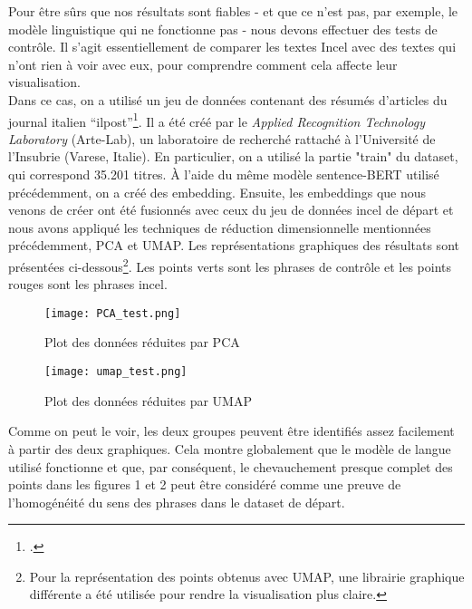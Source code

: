 Pour être sûrs que nos résultats sont fiables - et que ce n'est pas, par exemple, le modèle linguistique qui ne fonctionne pas - nous devons effectuer des tests de contrôle. Il s'agit essentiellement de comparer les textes Incel avec des textes qui n'ont rien à voir avec eux, pour comprendre comment cela affecte leur visualisation.\\

Dans ce cas, on a utilisé un jeu de données contenant des résumés d'articles du journal italien “ilpost”\footcite{ilpost2022}. Il a été créé par le \emph{Applied Recognition Technology Laboratory} (Arte-Lab), un laboratoire de recherché rattaché à l'Université de l'Insubrie (Varese, Italie). En particulier, on a utilisé la partie "train" du dataset, qui correspond 35.201 titres. À l'aide du même modèle sentence-BERT utilisé précédemment, on a créé des embedding. Ensuite, les embeddings que nous venons de créer ont été fusionnés avec ceux du jeu de données incel de départ et nous avons appliqué les techniques de réduction dimensionnelle mentionnées précédemment, PCA et UMAP. Les représentations graphiques des résultats sont présentées ci-dessous\footnote{Pour la représentation des points obtenus avec UMAP, une librairie graphique différente a été utilisée pour rendre la visualisation plus claire.}. Les points verts sont les phrases de contrôle et les points rouges sont les phrases incel.

\begin{figure}[h!]
	\texttt{[image: PCA\_test.png]}
	\centering
	\caption{Plot des données réduites par PCA}
\end{figure}

\begin{figure}[h!]
	\texttt{[image: umap\_test.png]}
	\centering
	\caption{Plot des données réduites par UMAP}
\end{figure}

\clearpage

Comme on peut le voir, les deux groupes peuvent être identifiés  assez facilement à partir des deux graphiques. 
Cela montre globalement que le modèle de langue utilisé fonctionne et que, par conséquent, le chevauchement presque complet des points dans les figures 1 et 2 peut être considéré comme une preuve de l'homogénéité du sens des phrases dans le dataset de départ.